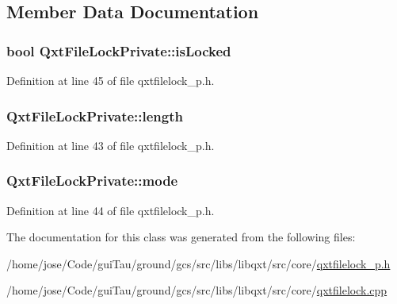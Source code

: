 \subsection{Member Data Documentation}
\hypertarget{class_qxt_file_lock_private_af419101912835e8ed5116675da869b0f}{
\subsubsection[{is\-Locked}]{\setlength{\rightskip}{0pt plus 5cm}bool Qxt\-File\-Lock\-Private\-::is\-Locked}}\label{class_qxt_file_lock_private_af419101912835e8ed5116675da869b0f}


Definition at line 45 of file qxtfilelock\-\_\-p.\-h.

\hypertarget{class_qxt_file_lock_private_ada407fd4e2da4ec1b70c023980976a6f}{
\subsubsection[{length}]{ Qxt\-File\-Lock\-Private\-::length}}\label{class_qxt_file_lock_private_ada407fd4e2da4ec1b70c023980976a6f}


Definition at line 43 of file qxtfilelock\-\_\-p.\-h.

\hypertarget{class_qxt_file_lock_private_a78778fc13decc34cfad023ea406851e0}{
\subsubsection[{mode}]{ Qxt\-File\-Lock\-Private\-::mode}}\label{class_qxt_file_lock_private_a78778fc13decc34cfad023ea406851e0}


Definition at line 44 of file qxtfilelock\-\_\-p.\-h.



The documentation for this class was generated from the following files\-:\begin{DoxyCompactItemize}
\item 
/home/jose/\-Code/gui\-Tau/ground/gcs/src/libs/libqxt/src/core/\hyperlink{qxtfilelock__p_8h}{qxtfilelock\-\_\-p.\-h}\item 
/home/jose/\-Code/gui\-Tau/ground/gcs/src/libs/libqxt/src/core/\hyperlink{qxtfilelock_8cpp}{qxtfilelock.\-cpp}\end{DoxyCompactItemize}
